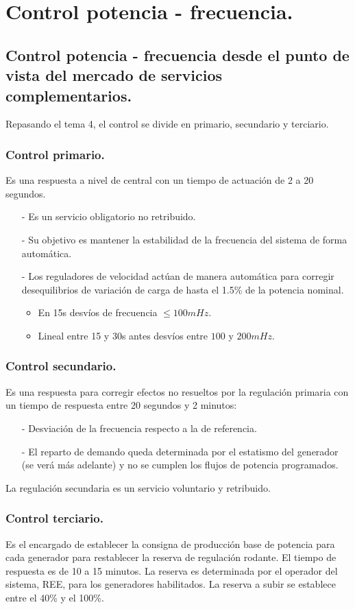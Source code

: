 \chapter{Control potencia - frecuencia.}
\section{Control potencia - frecuencia desde el punto de vista del mercado de servicios complementarios.}


Repasando el tema 4, el control se divide en primario, secundario y terciario.
\subsection{Control primario.}
Es una respuesta a nivel de central con un tiempo de actuación de 2 a 20 segundos.
\begin{itemize}
	\item [-] Es un servicio obligatorio no retribuido.
	\item [-] Su objetivo es mantener la estabilidad de la frecuencia del sistema de forma automática.
	\item [-] Los reguladores de velocidad actúan de manera automática para corregir desequilibrios de variación de carga de hasta el 1.5\% de la potencia nominal.
	\begin{itemize}
		\item En 15s desvíos de frecuencia $\le 100mHz$.
		\item Lineal entre 15 y 30s antes desvíos entre $100$ y $200mHz$.
	\end{itemize}
\end{itemize}
\subsection{Control secundario.}
Es una respuesta para corregir efectos no resueltos por la regulación primaria con un tiempo de respuesta entre 20 segundos y 2 minutos:
\begin{itemize}
	\item [-] Desviación de la frecuencia respecto a la de referencia.  
	\item [-] El reparto de demando queda determinada por el estatismo del generador (se verá más adelante) y no se cumplen los flujos de potencia programados.
\end{itemize}
La regulación secundaria es un servicio voluntario y retribuido. 
\subsection{Control terciario.}
Es el encargado de establecer la consigna de producción base de potencia para cada generador para restablecer la reserva de regulación rodante. El tiempo de respuesta es de 10 a 15 minutos. La reserva es determinada por el operador del sistema, REE, para los generadores habilitados. La reserva a subir se establece entre el 40\% y el 100\%.


